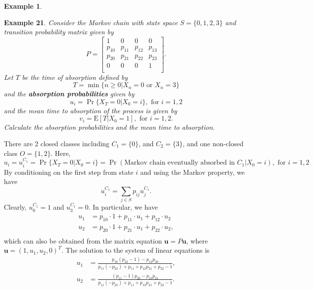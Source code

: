 \documentclass[
]{book}
\theoremstyle{definition}
\theoremstyle{definition}
\newtheorem{example}{Example}[chapter]
\theoremstyle{definition}
\theoremstyle{definition}
\theoremstyle{remark}
\begin{document}
\begin{example}
\protect\hypertarget{exm:eg_absorption2}{}\label{exm:eg_absorption2}

\textbf{Example 21}. \emph{Consider the Markov chain with state space
\(S = \{0,1,2,3\}\) and transition probability matrix given by
\[P = \begin{bmatrix}
    1 & 0 & 0  & 0  \\
    p_{10} & p_{11} & p_{12} & p_{13}   \\
    p_{20} & p_{21} & p_{22} & p_{23}   \\
   0 & 0 & 0 & 1   \\
\end{bmatrix}.\] Let \(T\) be the time of absorption defined by
\[T = \min\{ n \ge 0 | X_n = 0 \text{ or } X_n = 3 \}\] and the
\textbf{absorption probabilities} given by
\[u_i = \Pr\{ X_T = 0 | X_0 = i  \}, \text{ for } i = 1,2\] and the mean
time to absorption of the process is given by
\[v_i  = \mathrm{E}[T |  X_0 = 1 ] , \text{ for } i = 1,2.\] Calculate
the absorption probabilities and the mean time to absorption.}

\end{example}

There are 2 closed classes including \(C_1= \{ 0 \}\), and \(C_2= \{ 3 \}\),
and one non-closed class \(O = \{1,2 \}\). Here,
\[u_i = u_i^{C_1} = \Pr\{ X_T = 0 | X_0 = i  \} = \Pr(\text{Markov chain eventually absorbed in } C_1 | X_0 = i), \text{ for } i = 1,2\]
By conditioning on the first step from state \(i\) and using the Markov
property, we have \[u_i^{C_1} = \sum_{j \in S} p_{ij} u_j^{C_1}.\]
Clearly, \(u_0^{C_1} = 1\) and \(u_3^{C_1} = 0\). In particular, we have
\[\begin{aligned}
    u_1 &= p_{10} \cdot 1 + p_{11} \cdot u_1 + p_{12} \cdot u_2 \\
    u_2 &= p_{20} \cdot 1 + p_{21} \cdot u_1 + p_{22} \cdot u_2, \\\end{aligned}\]
which can also be obtained from the matrix equation
\(\mathbf{u} = P\mathbf{u}\), where \(\mathbf{u} = (1, u_1, u_2, 0)^T\). The
solution to the system of linear equations is \[\begin{aligned}
    u_1 &= \frac{ p_{10} (p_{22} - 1) - p_{12} p_{20}  }{ p_{11}(-p_{22}) +  p_{11}  + p_{12} p_{21}  + p_{22} - 1}, \\
    u_2 &= \frac{(  p_{11} - 1) p_{20} - p_{10} p_{21}  }{    p_{11}(-p_{22})  + p_{11}  + p_{12} p_{21} + p_{22} -1  }  . \\\end{aligned}\]
\end{document}
